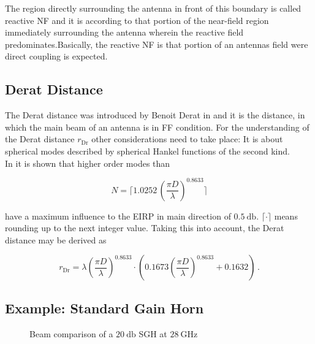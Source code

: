 The region directly surrounding the antenna in front of this boundary is called reactive \ac{NF} and it is according to \cite{balanis} \glqq that portion of the near-field region immediately surrounding the antenna wherein the reactive field predominates.\grqq{ }Basically, the reactive \ac{NF} is that portion of an antennas field were direct coupling is expected.

\subsection{Derat Distance}

The Derat distance was introduced by Benoit Derat in \cite{8393926} and it is the distance, in which the main beam of an antenna is in \ac{FF} condition. For the understanding of the Derat distance $r_{\text{Dr}}$ other considerations need to take place: It is about spherical modes described by spherical Hankel functions  of the second kind. \cite{8393926} \cite{hansen}\\
In \cite{8393926} it is shown that higher order modes than 

\begin{equation}
N = \Bigg\lceil 1.0252\,\left(\frac{\pi D}{\lambda}\right)^{0.8633} \Bigg\rceil
\end{equation}

have a maximum influence to the \ac{EIRP} in main direction of $\SI{0.5}{\decibel}$. $\lceil\cdot\rceil$ means rounding up to the next integer value. Taking this into account, the Derat distance may be derived as

\begin{equation}
r_{\text{Dr}} = \lambda\left(\frac{\pi D}{\lambda}\right)^{0.8633}\cdot\left(0.1673\left(\frac{\pi D}{\lambda}\right)^{0.8633}+0.1632\right)\,.
\end{equation}

\subsection{Example: Standard Gain Horn}

\begin{figure}[h]
\centering
  \centering
  \centering
  \centering
  \centering
\caption{Beam comparison of a $\SI{20}{\decibel}$ SGH at $\SI{28}{\giga\hertz}$}
\label{fig:beamcpmp}
\end{figure}

